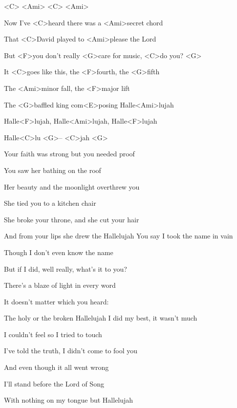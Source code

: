 

<C> <Ami> <C> <Ami>

\zs
Now I've <C>heard there was a <Ami>secret chord

That <C>David played to <Ami>please the Lord

But <F>you don't really <G>care for music, <C>do you? <G>

It <C>goes like this, the <F>fourth, the <G>fifth

The <Ami>minor fall, the <F>major lift

The <G>baffled king com<E>posing Halle<Ami>lujah
\ks

\zr
Halle<F>lujah, Halle<Ami>lujah, Halle<F>lujah

Halle<C>lu <G>-- <C>jah <G>
\kr

\zs
Your faith was strong but you needed proof

You saw her bathing on the roof

Her beauty and the moonlight overthrew you

She tied you to a kitchen chair

She broke your throne, and she cut your hair

And from your lips she drew the Hallelujah
\ks
\zr \kr
\zs
You say I took the name in vain

Though I don't even know the name

But if I did, well really, what's it to you?

There's a blaze of light in every word

It doesn't matter which you heard:

The holy or the broken Hallelujah
\ks
\zr \kr
\zs
I did my best, it wasn't much

I couldn't feel so I tried to touch

I've told the truth, I didn't come to fool you

And even though it all went wrong

I'll stand before the Lord of Song

With nothing on my tongue but Hallelujah
\ks
\zr \kr
\kp
